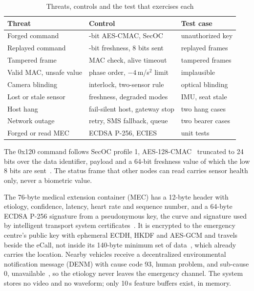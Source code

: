 \documentclass[conference]{IEEEtran}
\begin{document}
\begin{table}[!t]
\caption{Threats, controls and the test that exercises each}
\label{tab:threats}
\centering
\footnotesize
\begin{tabular}{@{}>{\raggedright\arraybackslash}p{2.6cm}>{\raggedright\arraybackslash}p{3.4cm}>{\raggedright\arraybackslash}p{2.0cm}@{}}
\toprule
Threat & Control & Test case \\
\midrule
Forged command & 24-bit AES-CMAC, SecOC & unauthorized key \\
Replayed command & 64-bit freshness, 8 bits sent & replayed frames \\
Tampered frame & MAC check, alive timeout & tampered frames \\
Valid MAC, unsafe value & phase order, $-4$\,m/s$^2$ limit & implausible \\
Camera blinding & interlock, two-sensor rule & optical blinding \\
Lost or stale sensor & freshness, degraded modes & IMU, seat stale \\
Host hang & fail-silent host, gateway stop & two hang cases \\
Network outage & retry, SMS fallback, queue & two bearer cases \\
Forged or read MEC & ECDSA P-256, ECIES & unit tests \\
\bottomrule
\end{tabular}
\end{table}

The 0x120 command follows SecOC profile 1, AES-128-CMAC~\cite{nist80038b} truncated to 24 bits over the data identifier, payload and a 64-bit freshness value of which the low 8 bits are sent~\cite{autosar_secoc}. The status frame that other nodes can read carries sensor health only, never a biometric value.

The 76-byte medical extension container (MEC) has a 12-byte header with etiology, confidence, latency, heart rate and sequence number, and a 64-byte ECDSA P-256 signature from a pseudonymous key, the curve and signature used by intelligent transport system certificates~\cite{etsi103097}. It is encrypted to the emergency centre's public key with ephemeral ECDH, HKDF and AES-GCM and travels beside the eCall, not inside its 140-byte minimum set of data~\cite{en15722}, which already carries the location. Nearby vehicles receive a decentralized environmental notification message (DENM) with cause code 93, human problem, and sub-cause 0, unavailable~\cite{etsi102894}, so the etiology never leaves the emergency channel. The system stores no video and no waveform; only 10\,s feature buffers exist, in memory.
\end{document}
